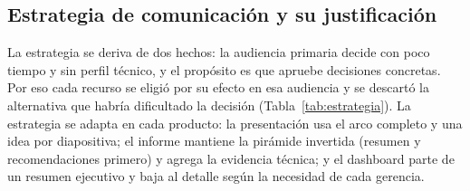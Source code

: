 \documentclass[conference,a4paper]{IEEEtran}
\begin{document}
\subsection{Estrategia de comunicación y su justificación}
\label{sec:estrategia}
La estrategia se deriva de dos hechos: la audiencia primaria decide con poco tiempo y sin perfil técnico, y el propósito es que apruebe decisiones concretas. Por eso cada recurso se eligió por su efecto en esa audiencia y se descartó la alternativa que habría dificultado la decisión (Tabla~\ref{tab:estrategia}). La estrategia se adapta en cada producto: la presentación usa el arco completo y una idea por diapositiva; el informe mantiene la pirámide invertida (resumen y recomendaciones primero) y agrega la evidencia técnica; y el dashboard parte de un resumen ejecutivo y baja al detalle según la necesidad de cada gerencia.
\end{document}
